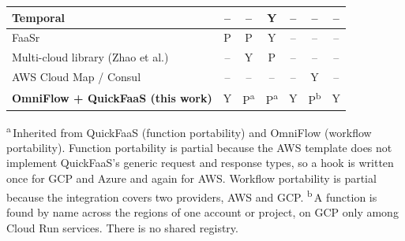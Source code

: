 \begin{table}[tbp]
\begin{tabular}{|>{\raggedright\arraybackslash}p{}|c|c|c|c|c|c|}
    \hline
    Temporal~\cite{temporalPlatform}                    & -- & -- & Y & -- & -- & -- \\
    \hline
    FaaSr~\cite{park2024faasr}                          & P & P & Y & -- & -- & -- \\
    \hline
    Multi-cloud library (Zhao et al.)~\cite{zhao2022supporting} & -- & Y & P & -- & -- & -- \\
    \hline
    AWS Cloud Map / Consul~\cite{awsCloudMap,consulServiceDiscovery} & -- & -- & -- & -- & Y & -- \\
    \hline
    \textbf{OmniFlow + QuickFaaS (this work)}           & Y & P\textsuperscript{a} & P\textsuperscript{a} & Y & P\textsuperscript{b} & Y \\
    \hline
  \end{tabular}

  \smallskip
  \parbox{\textwidth}{\footnotesize \textsuperscript{a}\,Inherited from QuickFaaS (function
  portability) and OmniFlow (workflow portability). Function portability is partial because the AWS
  template does not implement QuickFaaS's generic request and response types, so a hook is written
  once for GCP and Azure and again for AWS. Workflow portability is partial because the integration
  covers two providers, AWS and GCP.
  \textsuperscript{b}\,A function is found by name across the regions of one account or project,
  on GCP only among Cloud Run services. There is no shared registry.}
\end{table}
